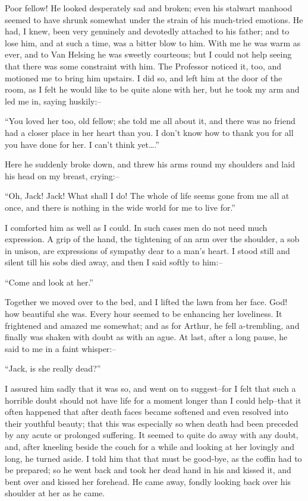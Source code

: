 \documentclass[12pt,openright]{book}
\begin{document}
Poor fellow! He looked desperately sad and broken; even his stalwart manhood seemed to have shrunk somewhat under the strain of his much-tried emotions. He had, I knew, been very genuinely and devotedly attached to his father; and to lose him, and at such a time, was a bitter blow to him. With me he was warm as ever, and to Van Helsing he was sweetly courteous; but I could not help seeing that there was some constraint with him. The Professor noticed it, too, and motioned me to bring him upstairs. I did so, and left him at the door of the room, as I felt he would like to be quite alone with her, but he took my arm and led me in, saying huskily:–

“You loved her too, old fellow; she told me all about it, and there was no friend had a closer place in her heart than you. I don’t know how to thank you for all you have done for her. I can’t think yet….”

Here he suddenly broke down, and threw his arms round my shoulders and laid his head on my breast, crying:–

“Oh, Jack! Jack! What shall I do! The whole of life seems gone from me all at once, and there is nothing in the wide world for me to live for.”

I comforted him as well as I could. In such cases men do not need much expression. A grip of the hand, the tightening of an arm over the shoulder, a sob in unison, are expressions of sympathy dear to a man’s heart. I stood still and silent till his sobs died away, and then I said softly to him:–

“Come and look at her.”

Together we moved over to the bed, and I lifted the lawn from her face. God! how beautiful she was. Every hour seemed to be enhancing her loveliness. It frightened and amazed me somewhat; and as for Arthur, he fell a-trembling, and finally was shaken with doubt as with an ague. At last, after a long pause, he said to me in a faint whisper:–

“Jack, is she really dead?”

I assured him sadly that it was so, and went on to suggest–for I felt that such a horrible doubt should not have life for a moment longer than I could help–that it often happened that after death faces became softened and even resolved into their youthful beauty; that this was especially so when death had been preceded by any acute or prolonged suffering. It seemed to quite do away with any doubt, and, after kneeling beside the couch for a while and looking at her lovingly and long, he turned aside. I told him that that must be good-bye, as the coffin had to be prepared; so he went back and took her dead hand in his and kissed it, and bent over and kissed her forehead. He came away, fondly looking back over his shoulder at her as he came.
\end{document}
